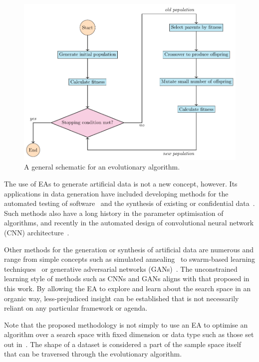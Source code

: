 \documentclass[smallextended]{svjour3}
\newlength{\imgwidth}
\begin{document}
\begin{figure}[htbp]
    \centering
    \includegraphics[width=\imgwidth]{Fig2.pdf}
    \caption{%
        A general schematic for an evolutionary algorithm.
    }\label{fig:flowchart}
\end{figure}

The use of EAs to generate artificial data is not a new concept, however. Its
applications in data generation have included developing methods for the
automated testing of software~\cite{Koleejan2015,Michael2001,Sharifipour2018}
and the synthesis of existing or confidential data~\cite{Chen2016}. Such methods
also have a long history in the parameter optimisation of algorithms, and
recently in the automated design of convolutional neural network (CNN)
architecture~\cite{Suganuma2017,Sun2018}.

Other methods for the generation or synthesis of artificial data are numerous
and range from simple concepts such as simulated annealing~\cite{Matejka2017}
to swarm-based learning techniques~\cite{Abualigah2018b} or generative
adversarial networks (GANs)~\cite{Goodfellow2014}. The unconstrained learning
style of methods such as CNNs and GANs aligns with that proposed in this work.
By allowing the EA to explore and learn about the search space in an organic
way, less-prejudiced insight can be established that is not necessarily reliant
on any particular framework or agenda.

Note that the proposed methodology is not simply to use an EA to optimise an
algorithm over a search space with fixed dimension or data type such as those
set out in~\cite{Chen2016}. The shape of a dataset is considered a part of the
sample space itself that can be traversed through the evolutionary algorithm.
\end{document}
